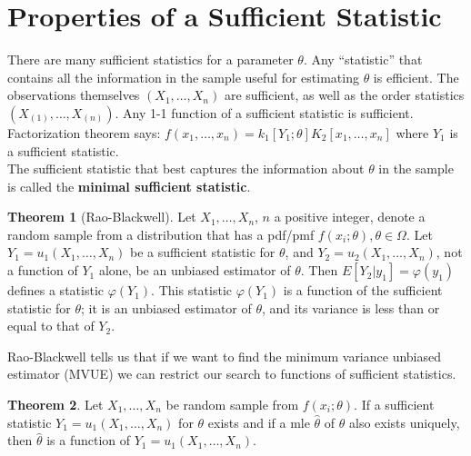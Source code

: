\documentclass{book}
\theoremstyle{definition}
\newtheorem{thm}{Theorem}[section]
\begin{document}
\section{Properties of a Sufficient Statistic}

There are many sufficient statistics for a parameter $\theta$. Any ``statistic'' that contains all the information in the sample useful for estimating $\theta$ is efficient. The observations themselves $(X_1,\dots,X_n)$ are sufficient, as well as the order statistics $(X_{(1)},\dots,X_{(n)})$. Any 1-1 function of a sufficient statistic is sufficient. \\

Factorization theorem says: $f(x_1,\dots,x_n) = k_1[Y_1;\theta] K_2 [x_1,\dots,x_n]$ where $Y_1$ is a sufficient statistic. \\

The sufficient statistic that best captures the information about $\theta$ in the sample is called the \textbf{minimal sufficient statistic}. 



\begin{thm}[Rao-Blackwell] 
	Let $X_1,\dots, X_n$, $n$ a positive integer, denote a random sample from a distribution that has a pdf/pmf $f(x_i;\theta), \theta \in \Omega$. Let $Y_1 = u_1(X_1,\dots,X_n)$ be a sufficient statistic for $\theta$, and $Y_2 = u_2(X_1,\dots,X_n)$, not a function of $Y_1$ alone, be an unbiased estimator of $\theta$. Then $E[Y_2 \vert y_1] = \varphi(y_1)$ defines a statistic $\varphi(Y_1)$. This statistic $\varphi(Y_1)$ is a function of the sufficient statistic for $\theta$; it is an unbiased estimator of $\theta$, and its variance is less than or equal to that of $Y_2$. 
\end{thm}

Rao-Blackwell tells us that if we want to find the minimum variance unbiased estimator (MVUE) we can restrict our search to functions of sufficient statistics.


\begin{thm}
	Let $X_1,\dots,X_n$ be random sample from $f(x_i;\theta)$. If a sufficient statistic $Y_1 = u_1(X_1,\dots,X_n)$ for $\theta$ exists and if a mle $\hat\theta$ of $\theta$ also exists uniquely, then $\hat\theta$ is a function of $Y_1 = u_1(X_1,\dots,X_n)$. 
\end{thm} 
\end{document}
